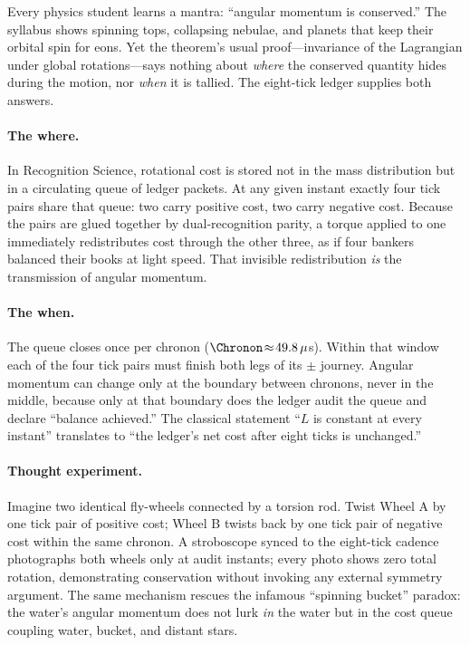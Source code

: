 \documentclass[11pt,oneside]{book}
\begin{document}
Every physics student learns a mantra: “angular momentum is
conserved.”  The syllabus shows spinning tops, collapsing nebulae, and
planets that keep their orbital spin for eons.  
Yet the theorem’s usual proof—invariance of the Lagrangian under
global rotations—says nothing about \emph{where} the conserved
quantity hides during the motion, nor \emph{when} it is tallied.
The eight-tick ledger supplies both answers.

\paragraph{The where.}
In Recognition Science, rotational cost is stored not in the mass
distribution but in a circulating queue of ledger packets.  
At any given instant exactly four tick pairs share that queue:
two carry positive cost, two carry negative cost.
Because the pairs are glued together by dual‐recognition parity, a
torque applied to one immediately redistributes cost through the other
three, as if four bankers balanced their books at light speed.  
That invisible redistribution \emph{is} the transmission of angular
momentum.

\paragraph{The when.}
The queue closes once per chronon ($\Chronon\!\approx\!49.8\,\mu$s).
Within that window each of the four tick pairs must finish both legs
of its $\pm$ journey.  
Angular momentum can change only at the boundary between chronons,
never in the middle, because only at that boundary does the ledger
audit the queue and declare “balance achieved.”  
The classical statement “$L$ is constant at every instant” translates
to “the ledger’s net cost after eight ticks is unchanged.”

\paragraph{Thought experiment.}
Imagine two identical fly-wheels connected by a torsion rod.  
Twist Wheel A by one tick pair of positive cost;  
Wheel B twists back by one tick pair of negative cost within the same
chronon.  
A stroboscope synced to the eight-tick cadence photographs both wheels
only at audit instants; every photo shows zero total rotation,
demonstrating conservation without invoking any external symmetry
argument.  
The same mechanism rescues the infamous “spinning bucket”
paradox: the water’s angular momentum does not lurk \emph{in} the
water but in the cost queue coupling water, bucket, and distant stars.
\end{document}
